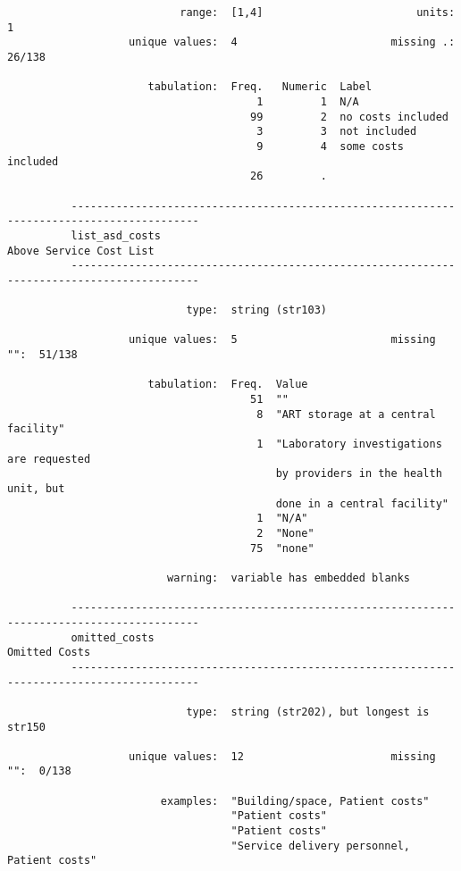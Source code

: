 \documentclass{article}
\begin{document}
\begin{verbatim}
                           range:  [1,4]                        units:  1
                   unique values:  4                        missing .:  26/138
          
                      tabulation:  Freq.   Numeric  Label
                                       1         1  N/A
                                      99         2  no costs included
                                       3         3  not included
                                       9         4  some costs included
                                      26         .  
          
          ------------------------------------------------------------------------------------------
          list_asd_costs                                                     Above Service Cost List
          ------------------------------------------------------------------------------------------
          
                            type:  string (str103)
          
                   unique values:  5                        missing "":  51/138
          
                      tabulation:  Freq.  Value
                                      51  ""
                                       8  "ART storage at a central facility"
                                       1  "Laboratory investigations are requested
                                          by providers in the health unit, but
                                          done in a central facility"
                                       1  "N/A"
                                       2  "None"
                                      75  "none"
          
                         warning:  variable has embedded blanks
          
          ------------------------------------------------------------------------------------------
          omitted_costs                                                                Omitted Costs
          ------------------------------------------------------------------------------------------
          
                            type:  string (str202), but longest is str150
          
                   unique values:  12                       missing "":  0/138
          
                        examples:  "Building/space, Patient costs"
                                   "Patient costs"
                                   "Patient costs"
                                   "Service delivery personnel, Patient costs"
          

\end{verbatim}
\end{document}

